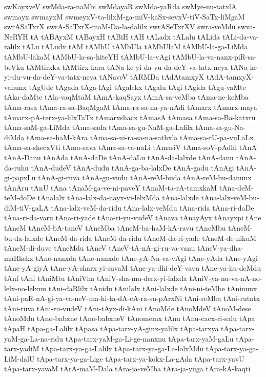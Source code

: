 {swKayxveV
swMda-ra-naMbi
swMdayaR
swMda-yaRda
swMye-nu-tatxlA
swmayx
swmayxM
swmeyxV-ta-lilxM-ga-miV-kaSx-sevxV-tiV-SaTx-liMgaM
swrASaTxrX
swrA-SaTxrX-maM-Da-la-dalilx
swrASeTxrXV
swra-veMdu
swva-NeRYH
tA
tABAyxM
tABayxH
tABiH
tAH
tALadx
tALalu
tALida
tALi-da-va-ralilx
tALu
tALudx
tAM
tAMbU
tAMbUla
tAMbUlaM
tAMbU-la-ga-LiMda
tAMbU-lakaM
tAMbU-la-sa-hiteYH
tAMbU-la-vAgi
tAMbU-la-va-nanx-piR-sa-beVku
tAMtirxka
tAMtirx-kara
tANa-ke-yi-da-vu-da-deY-va-tatx-neya
tANa-ke-yi-du-vu-da-deY-va-tatx-neya
tANaveV
tARMDa
tAdAtamxyX
tAdA-tamxyX-vanunx
tAgUde
tAgada
tAga-lAgi
tAgalekx
tAgalu
tAgi
tAgida
tAgu-vaMte
tAka-daMte
tAla-vaqMtaM
tAmA-kaqSayx
tAmA-sa-veMba
tAma-ne-keMba
tAma-rasa
tAma-ra-sa-BaqMgaM
tAma-ra-sa-na-ya-nAdi
tAmarx
tAmarx-maya
tAmarx-pA-terx-ya-lilxTaTx
tAmarxshacx
tAmasA
tAmasa
tAma-sa-Ba-katxru
tAma-saM-ga-LiMda
tAma-sada
tAma-sa-gu-NaM-ga-Lalilx
tAma-sa-gu-Na-diMda
tAma-sa-haM-kAra
tAma-sa-ni-ra-sa-na-sathxla
tAma-sa-rU-pa-vuLaLx
tAma-sa-shecxVti
tAma-sava
tAma-sa-va-naLi
tAmasiV
tAma-soV-pAdhi
tAnA
tAnA-Danu
tAnAda
tAnA-daDe
tAnA-daLu
tAnA-da-lalxde
tAnA-danu
tAnA-da-ruhu
tAnA-dudeV
tAnA-dudu
tAnA-ga-ba-lalxDe
tAnA-gadu
tAnAgi
tAnA-gi-papxLu
tAnA-gi-ruva
tAnA-gu-vudu
tAnA-reM-buda
tAnA-reM-bu-danunx
tAnAru
tAnU
tAna
tAnaM-ga-ve-ni-paveY
tAnaM-ta-rA-tamxkaM
tAna-deM-teM-doDe
tAnalalx
tAna-lalx-da-nayx-vi-lelxMda
tAna-lalxde
tAna-lalx-veM-bu-diM-tiV-gaLA
tAna-lalx-veM-da-ridu
tAna-lalx-veMdu
tAna-rida
tAna-ri-daDe
tAna-ri-da-varu
tAna-ri-yade
tAna-ri-yu-vudeV
tAnava
tAnayAyx
tAnayxpi
tAne
tAneM
tAneM-bA-taneV
tAneMba
tAneM-ba-haM-kA-ravu
tAneMbu
tAneM-bu-da-lalxde
tAneM-da-rida
tAneM-da-ridu
tAneM-da-ri-yade
tAneM-de-nikuM
tAneM-di-duve
tAneMdu
tAneV
tAneV-tA-nA-gi-ru-va-vanu
tAneV-ya-dha-maRkekx
tAne-nanxda
tAne-nanxde
tAne-yA-Na-va-vAgi
tAne-yAda
tAne-yAgi
tAne-yA-giyA
tAne-yA-sharx-yi-suvaM
tAne-ya-dhi-deY-vavu
tAne-ya-hu-deMdu
tAnf
tAni
tAniMtu
tAniVha
tAniV-sha-mu-derx-yi-lalxda
tAniV-ya-nu-va-nA-no-lelx-no-lelxnu
tAni-daRlilx
tAnidu
tAnilalx
tAni-lalxde
tAni-ni-teMbe
tAninunx
tAni-paR-nA-gi-ya-va-neV-ma-hi-ta-dA-cA-ra-su-pArxNi
tAni-reMba
tAni-rutatx
tAni-ruva
tAni-ru-vudeV
tAni-tAyx-di-kAni
tAnoMde
tAnoMdeV
tAnoM-dese
tAnoMdu
tAno-babxne
tAno-babxneV
tAnomemx
tAnu
tAnu-cacx-ri-salu
tApa
tApaH
tApa-ga-Lalilx
tApasa
tApa-tarx-yA-ginx-yalilx
tApa-tarxya
tApa-tarx-yaM-ga-La-na-ridu
tApa-tarx-yaM-ga-Li-ge-nanxnu
tApa-tarx-yaM-gaLu
tApa-tarx-yadiM
tApa-tarx-ya-ga-Lalilx
tApa-tarx-ya-ga-La-lolxMdu
tApa-tarx-ya-ga-LiM-dalU
tApa-tarx-ya-ga-Lige
tApa-tarx-ya-kokx-La-gAda
tApa-tarx-yavU
tApa-tarx-yavaM
tArA-maM-Dala
tAra-ja-veMba
tAra-ja-yuga
tAra-kA-kaqti
}
